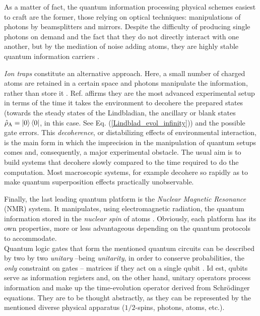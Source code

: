 \documentclass[11pt]{article}
\numberwithin{equation}{section} %
\numberwithin{figure}{section} %
\begin{document}
\begin{appendices}
As a matter of fact, the quantum information processing physical schemes easiest to craft are the former, those relying on optical techniques: manipulations of photons by beamsplitters and mirrors. Despite the difficulty of producing single photons on demand and the fact that they do not directly interact with one another, but by the mediation of noise adding atoms, they are highly stable quantum information carriers \cite[p.~49, l.~8-21]{Nielsen}.

\emph{Ion traps} constitute an alternative approach. Here, a small number of charged atoms are retained in a certain space and photons manipulate the information, rather than store it \cite[p.~49, l.~23-29]{Nielsen}. Ref. \cite[p.~3, l.~ 52-54]{Bio_Cloning} affirms they are the most advanced experimental setup in terms of the time it takes the environment to decohere the prepared states (towards the steady states of the Lindbladian, the ancillary or blank states $\hat{\rho}_\textrm{A}=\ket{0}\bra{0}$, in this case. See Eq. (\ref{Lindblad_evol_infinity})) and the possible gate errors. This \emph{decoherence}, or distabilizing effects of environmental interaction, is the main form in which the imprecision in the manipulation of quantum setups comes and, consequently, a major experimental obstacle. The usual aim is to build systems that decohere slowly compared to the time required to do the computation. Most macroscopic systems, for example decohere so rapidly as to make quantum superposition effects practically unobservable.

 Finally, the last leading quantum platform is the \emph{Nuclear Magnetic Resonance} (NMR) system. It manipulates, using electromagnetic radiation, the quantum information stored in the \emph{nuclear spin} of atoms \cite[p.~49, l.~39-42]{Nielsen}. Obviously, each platform has its own properties, more or less advantageous depending on the quantum protocols to accommodate.\\

Quantum logic gates that form the mentioned quantum circuits can be described by two by two \emph{unitary} --being \emph{unitarity}, in order to conserve probabilities, the \emph{only} constraint on gates \cite[p.~18, l.~30]{Nielsen}\cite[p.~76, l.~19-20]{Deutsch}-- matrices if they act on a single qubit  \cite[p.~18, l.~22]{Nielsen}. Id est, qubits serve as information registers and, on the other hand, unitary operators process information and make up the time-evolution operator \cite[p.~67, Eq.~(2.1.5)]{Sakurai} derived from Schrödinger equations. They are to be thought abstractly, as they can be represented by the mentioned diverse physical apparatus ($1/2$-spins, photons, atoms, etc.).


\end{appendices}
\end{document}

